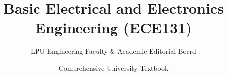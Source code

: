 \documentclass[a4paper,11pt,oneside,openany]{book}
\title{Basic Electrical and Electronics Engineering (ECE131)}
\author{LPU Engineering Faculty \& Academic Editorial Board}
\date{Comprehensive University Textbook}
\begin{document}
\frontmatter

\makebookcover
\copyrightpage
\disclaimerpage

\tableofcontents
\newpage

\mainmatter







\end{document}
